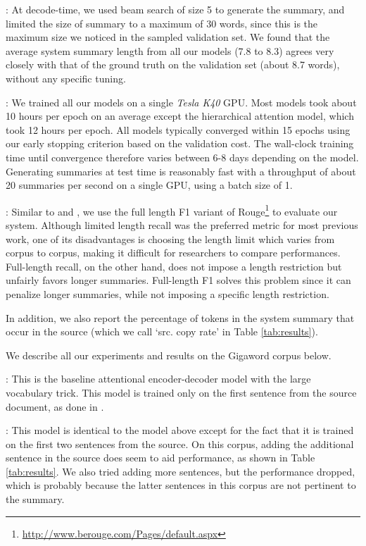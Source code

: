 \documentclass[11pt]{article}
\begin{document}
: At decode-time, we used beam search of size 5 to generate the summary, and limited the size of summary to a maximum of 30 words, since this is the maximum size we noticed in the sampled validation set. We found that the average system summary length from all our models (7.8 to 8.3) agrees very closely with that of the ground truth on the validation set (about 8.7 words), without any specific tuning. 

: We trained all our models on a single {\it Tesla K40} GPU. Most models took about 10 hours per epoch on an average except the hierarchical attention model, which took 12 hours per epoch. All models typically converged within 15 epochs using our early stopping criterion based on the validation cost. The wall-clock training time until convergence therefore varies between 6-8 days depending on the model. Generating summaries at test time is reasonably fast with a throughput of about 20 summaries per second on a single GPU, using a batch size of 1. 


: Similar to \cite{nallapati} and \cite{chopra}, we use the full length F1 variant of Rouge\footnote{\url{http://www.berouge.com/Pages/default.aspx}} to evaluate our system.
Although limited length recall was the preferred metric for most previous work, one of its disadvantages is choosing the length limit which varies from corpus to corpus, making it difficult for researchers to compare performances. Full-length recall, on the other hand, does not impose a length restriction but unfairly favors longer summaries. Full-length F1 solves this problem since it can penalize longer summaries, while not imposing a specific length restriction. 

In addition, we also report the percentage of tokens in the system summary that occur in the source (which we call `src. copy rate' in Table \ref{tab:results}). 

\noindent We describe all our experiments and results on the Gigaword corpus below.




: This is the baseline attentional encoder-decoder model with the large vocabulary trick. This model is trained only on the first sentence from the source document, as done in .

: This model is identical to the model above except for the fact that it is trained on the first two sentences from the source. On this corpus, adding the additional sentence in the source does seem to aid performance, as shown in Table \ref{tab:results}. We also tried adding more sentences, but the performance dropped, which is probably because the latter sentences in this corpus are not pertinent to the summary.
\end{document}
